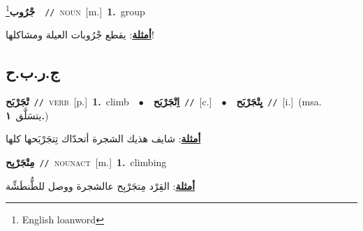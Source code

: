 \documentclass[10pt,a4paper,twoside]{article} %
\begin{document}
\begin{multicols}{2}
{\setlength\topsep{0pt}\textbf{\foreignlanguage{arabic}{جْرُوب}}\footnote{English loanword}\ \ {\color{gray}\texttt{//}\color{black}}\ \textsc{noun}\ [m.]\ \textbf{1.}~group\  \begin{flushright}\color{gray}\foreignlanguage{arabic}{\textbf{\underline{\foreignlanguage{arabic}{أمثلة}}}: يقطع جْرُوبات العيلة ومشاكلها!}\end{flushright}\color{black}} \vspace{2mm}

\vspace{-3mm}
\subsection*{\color{blue}\foreignlanguage{arabic}{ج.ر.ب.ح}\color{blue}{}} 

{\setlength\topsep{0pt}\textbf{\foreignlanguage{arabic}{تْجَرْبَح}}\ {\color{gray}\texttt{//}\color{black}}\ \textsc{verb}\ [p.]\ \textbf{1.}~climb\ \ $\bullet$\ \ \setlength\topsep{0pt}\textbf{\foreignlanguage{arabic}{اِتْجَرْبَح}}\ {\color{gray}\texttt{//}\color{black}}\ [c.]\ \ $\bullet$\ \ \setlength\topsep{0pt}\textbf{\foreignlanguage{arabic}{يِتْجَرْبَح}}\ {\color{gray}\texttt{//}\color{black}}\ [i.]\ \color{gray}(msa. \foreignlanguage{arabic}{يتسَلَّق}~\foreignlanguage{arabic}{\textbf{١.}})\color{black}\  \begin{flushright}\color{gray}\foreignlanguage{arabic}{\textbf{\underline{\foreignlanguage{arabic}{أمثلة}}}: شايف هذيك الشجرة أتحدّاك تِتجَرْبَحها كلها}\end{flushright}\color{black}} \vspace{2mm}

{\setlength\topsep{0pt}\textbf{\foreignlanguage{arabic}{مِتْجَرْبِح}}\ {\color{gray}\texttt{//}\color{black}}\ \textsc{noun\textunderscore act}\ [m.]\ \textbf{1.}~climbing\  \begin{flushright}\color{gray}\foreignlanguage{arabic}{\textbf{\underline{\foreignlanguage{arabic}{أمثلة}}}: القِرْد مِتجَرْبِح عالشجرة ووصل للطُّنطَشِّة}\end{flushright}\color{black}} \vspace{2mm}


\end{multicols}
\end{document}
